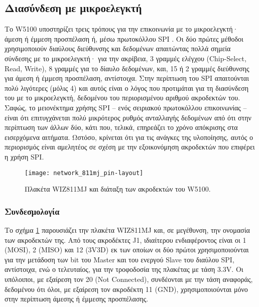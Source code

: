 \subsection{Διασύνδεση με μικροελεγκτή}
\label{subsec:network:interface}

Το W5100 υποστηρίζει τρεις τρόπους για την επικοινωνία με το μικροελεγκτή· άμεση
ή έμμεση προσπέλαση ή, μέσω πρωτοκόλλου SPI \parencite[59]{wiz11:w5100}. Οι δύο
πρώτες μέθοδοι χρησιμοποιούν διαύλους διεύθυνσης και δεδομένων απαιτώντας πολλά
σημεία σύνδεσης με το μικροελεγκτή· για την ακρίβεια, 3 γραμμές ελέγχου
(\textenglish{Chip-Select, Read, Write}), 8 γραμμές για το δίαυλο δεδομένων,
και, 15 ή 2 γραμμές διεύθυνσης για άμεση ή έμμεση προσπέλαση, αντίστοιχα. Στην
περίπτωση του SPI απαιτούνται πολύ λιγότερες (μόλις 4) και αυτός είναι ο λόγος
που προτιμάται για τη διασύνδεση του με το μικροελεγκτή, δεδομένου του
περιορισμένου αριθμού ακροδεκτών του.
Σαφώς, το μειονέκτημα χρήσης SPI -- ενός σειριακού
πρωτοκόλλου επικοινωνίας -- είναι ότι επιτυγχάνεται πολύ μικρότερος ρυθμός
ανταλλαγής δεδομένων από ότι στην περίπτωση των άλλων δύο, κάτι που, τελικά,
επηρεάζει το χρόνο απόκρισης στα εισερχόμενα αιτήματα. Ωστόσο, κρίνεται ότι για
τις ανάγκες της υλοποίησης, αυτός ο περιορισμός είναι αμελητέος σε σχέση με την
εξοικονόμηση ακροδεκτών που επιφέρει η χρήση SPI.

\begin{figure}
    \caption{Πλακέτα WIZ811MJ και διάταξη των ακροδεκτών του W5100.
    \label{fig:net:811mj-pins}}
    \begin{center}
    \texttt{[image: network\_811mj\_pin-layout]}
    \end{center}
\end{figure}


\subsubsection{Συνδεσμολογία}

Το σχήμα \ref{fig:net:811mj-pins} παρουσιάζει την πλακέτα WIZ811MJ και, σε
μεγέθυνση, την ονομασία των ακροδεκτών της. Από τους ακροδέκτες J1, ιδιαίτερου
ενδιαφέροντος είναι οι 1 (MOSI), 2 (MISO) και 12 (3V3D) εκ των οποίων οι δύο
πρώτοι χρησιμοποιούνται για την μετάδοση των bit του \textenglish{Master} και
του ενεργού \textenglish{Slave} του διαύλου SPI, αντίστοιχα, ενώ ο τελευταίος,
για την τροφοδοσία της πλακέτας με τάση 3.3V. Οι υπόλοιποι, με εξαίρεση τον 20
(\textenglish{Not Connected}), συνδέονται με την τάση αναφοράς, δεδομένου ότι
όλοι, με εξαίρεση τον ακροδέκτη 11 (GND), χρησιμοποιούνται μόνο στην περίπτωση
άμεσης ή έμμεσης προσπέλασης.

